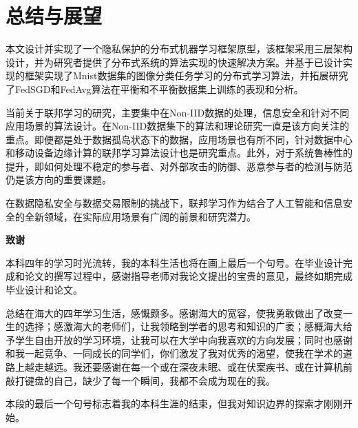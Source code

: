 \documentclass[zihao = -4,cn]{oucart}
\begin{document}
\newpage
\section{总结与展望}
本文设计并实现了一个隐私保护的分布式机器学习框架原型，该框架采用三层架构设计，并为研究者提供了分布式系统的算法实现的快速解决方案。并基于已设计实现的框架实现了Mnist数据集的图像分类任务学习的分布式学习算法，并拓展研究了FedSGD和FedAvg算法在平衡和不平衡数据集上训练的表现和分析。\par
当前关于联邦学习的研究，主要集中在Non-IID数据的处理，信息安全和针对不同应用场景的算法设计。在Non-IID数据集下的算法和理论研究一直是该方向关注的重点。即便都是处于数据孤岛状态下的数据，应用场景也有所不同，针对数据中心和移动设备边缘计算的联邦学习算法设计也是研究重点。此外，对于系统鲁棒性的提升，即如何处理不稳定的参与者、对外部攻击的防御、恶意参与者的检测与防范仍是该方向的重要课题。\par
在数据隐私安全与数据交易限制的挑战下，联邦学习作为结合了人工智能和信息安全的全新领域，在实际应用场景有广阔的前景和研究潜力。

\newpage
%


\newpage
\begin{center}
 \textbf{致谢} \\
\end{center}
\par
本科四年的学习时光流转，我的本科生活也将在画上最后一个句号。在毕业设计完成和论文的撰写过程中，感谢指导老师对我论文提出的宝贵的意见，最终如期完成毕业设计和论文。\par
总结在海大的四年学习生活，感慨颇多。感谢海大的宽容，使我勇敢做出了改变一生的选择；感激海大的老师们，让我领略到学者的思考和知识的广袤；感概海大给予学生自由开放的学习环境，让我可以在大学中向我喜欢的方向发展；同时也感谢和我一起竞争、一同成长的同学们，你们激发了我对优秀的渴望，使我在学术的道路上越走越远。我还要感谢在每一个或在深夜未眠、或在伏案疾书、或在计算机前敲打键盘的自己，缺少了每一个瞬间，我都不会成为现在的我。\par
本段的最后一个句号标志着我的本科生涯的结束，但我对知识边界的探索才刚刚开始。
\end{document}
